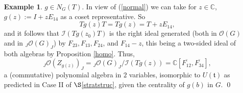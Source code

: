 \documentclass{amsart}
\numberwithin{equation}{section}
\theoremstyle{definition}
\newtheorem{example}[theorem]{Example}
\begin{document}
\begin{example}
 $g \in N_G(T)$.  In view of (\ref{normal}) we can take for $z \in \mathbb{C}$, $ g(z):= I + z E_{14}$ as a coset representative. So 
$$Tg(z)T =  Tg(z) =  T + z E_{14},$$
and it follows that $ \mathcal{I}(Tg(z_0)T)$  is the right ideal generated (both in $\mathcal{O}(G)$ and in ${}_J\mathcal{O}(G)_J$) by  $F_{23}, F_{13}, F_{24}$, and $F_{14} - z $, this being a two-sided ideal of both algebras by Proposition \ref{homo}. Thus,
\begin{equation}\label{shard} 
{}_J\mathcal{O}(Z_{g(z)})_J = {}_J\mathcal{O}(G)_J/\mathcal{I}(Tg(z)) = \mathbb{C}[ \overline{F_{12}}, \overline{F_{34}}], 
\end{equation}
a (commutative) polynomial algebra in $2$ variables, isomorphic to $U(\mathfrak{t})$ as predicted in Case II of $\S$\ref{stratstruc}, given the centrality of $g(b)$ in $G$. \qed
\end{example}
\end{document}

